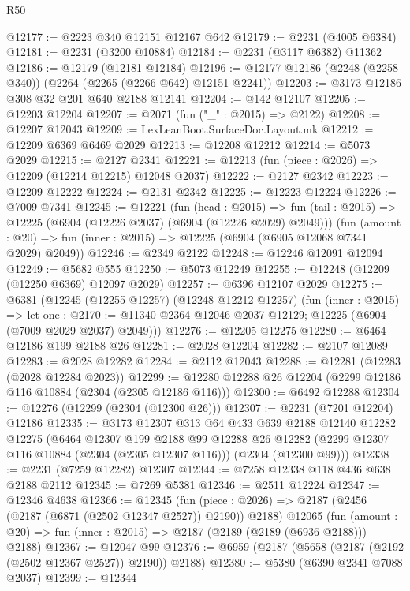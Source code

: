 \begin{lexlean}{R50}
\begin{coremodule}
@12177 := @2223 @340 @12151 @12167 @642
@12179 := @2231 (@4005 @6384)
@12181 := @2231 (@3200 @10884)
@12184 := @2231 (@3117 @6382) @11362
@12186 := @12179 (@12181 @12184)
@12196 := @12177 @12186 (@2248 (@2258 @340)) (@2264 (@2265 (@2266 @642) @12151 @2241))
@12203 := @3173 @12186 @308 @32 @201 @640 @2188 @12141
@12204 := @142 @12107
@12205 := @12203 @12204
@12207 := @2071 (fun ("_" : @2015) => @2122)
@12208 := @12207 @12043
@12209 := LexLeanBoot.SurfaceDoc.Layout.mk
@12212 := @12209 @6369 @6469 @2029
@12213 := @12208 @12212
@12214 := @5073 @2029
@12215 := @2127 @2341
@12221 := @12213 (fun (piece : @2026) => @12209 (@12214 @12215) @12048 @2037)
@12222 := @2127 @2342
@12223 := @12209 @12222
@12224 := @2131 @2342
@12225 := @12223 @12224
@12226 := @7009 @7341
@12245 := @12221
    (fun (head : @2015) =>
    fun (tail : @2015) => @12225 (@6904 (@12226 @2037) (@6904 (@12226 @2029) @2049)))
    (fun (amount : @20) => fun (inner : @2015) => @12225 (@6904 (@6905 @12068 @7341 @2029) @2049))
@12246 := @2349 @2122
@12248 := @12246 @12091 @12094
@12249 := @5682 @555
@12250 := @5073 @12249
@12255 := @12248 (@12209 (@12250 @6369) @12097 @2029)
@12257 := @6396 @12107 @2029
@12275 := @6381
    (@12245
      (@12255 @12257)
      (@12248 @12212 @12257)
      (fun (inner : @2015) =>
      let one : @2170 := @11340 @2364 @12046 @2037 @12129;
      @12225 (@6904 (@7009 @2029 @2037) @2049)))
@12276 := @12205 @12275
@12280 := @6464 @12186 @199 @2188 @26
@12281 := @2028 @12204
@12282 := @2107 @12089
@12283 := @2028 @12282
@12284 := @2112 @12043
@12288 := @12281 (@12283 (@2028 @12284 @2023))
@12299 := @12280 @12288 @26 @12204 (@2299 @12186 @116 @10884 (@2304 (@2305 @12186 @116)))
@12300 := @6492 @12288
@12304 := @12276 (@12299 (@2304 (@12300 @26)))
@12307 := @2231 (@7201 @12204) @12186
@12335 := @3173
    @12307
    @313
    @64
    @433
    @639
    @2188
    @12140
    @12282
    @12275
    (@6464
      @12307
      @199
      @2188
      @99
      @12288
      @26
      @12282
      (@2299 @12307 @116 @10884 (@2304 (@2305 @12307 @116)))
      (@2304 (@12300 @99)))
@12338 := @2231 (@7259 @12282) @12307
@12344 := @7258 @12338 @118 @436 @638 @2188 @2112
@12345 := @7269 @5381
@12346 := @2511 @12224
@12347 := @12346 @4638
@12366 := @12345
    (fun (piece : @2026) => @2187 (@2456 (@2187 (@6871 (@2502 @12347 @2527)) @2190)) @2188)
    @12065
    (fun (amount : @20) => fun (inner : @2015) => @2187 (@2189 (@2189 (@6936 @2188))) @2188)
@12367 := @12047 @99
@12376 := @6959 (@2187 (@5658 (@2187 (@2192 (@2502 @12367 @2527)) @2190)) @2188)
@12380 := @5380 (@6390 @2341 @7088 @2037)
@12399 := @12344

\end{coremodule}
\end{lexlean}
